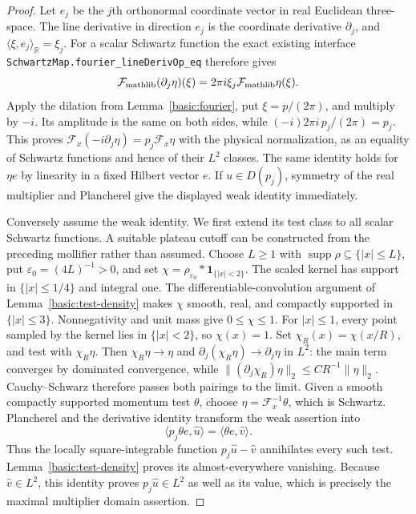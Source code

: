 \documentclass[11pt,a4paper]{article}
\theoremstyle{definition}
\theoremstyle{remark}
\begin{document}
\begin{proof}
Let $e_j$ be the $j$th orthonormal coordinate vector in real Euclidean
three-space. The line derivative in direction $e_j$ is the coordinate
derivative $\partial_j$, and $\langle\xi,e_j\rangle_{\mathbb R}=\xi_j$.
For a scalar Schwartz function the exact existing interface
\nolinkurl{SchwartzMap.fourier_lineDerivOp_eq} therefore gives
\[
 \mathcal F_{\rm mathlib}(\partial_j\eta)(\xi)
       =2\pi i\xi_j\mathcal F_{\rm mathlib}\eta(\xi).
\]
Apply the dilation from Lemma~\ref{basic:fourier}, put
$\xi=p/(2\pi)$, and multiply by $-i$. Its amplitude is the same
on both sides, while $(-i)2\pi i\,p_j/(2\pi)=p_j$.
This proves
$\mathcal F_x(-i\partial_j\eta)=p_j\mathcal F_x\eta$ with the
physical normalization, as an equality of Schwartz functions and
hence of their $L^2$ classes. The same identity holds for $\eta e$
by linearity in a fixed Hilbert vector $e$. If $u\in D(p_j)$,
symmetry of the real multiplier and
Plancherel give the displayed weak identity immediately.

Conversely assume the weak identity. We first extend its test class
to all scalar Schwartz functions. A suitable plateau cutoff can be
constructed from the preceding mollifier rather than assumed. Choose
$L\geq1$ with $\operatorname{supp}\rho\subseteq\{|x|\leq L\}$,
put $\varepsilon_0=(4L)^{-1}>0$, and set
$\chi=\rho_{\varepsilon_0}*\mathbf1_{\{|x|<2\}}$.
The scaled kernel has support in $\{|x|\leq1/4\}$ and integral one.
The differentiable-convolution argument of
Lemma~\ref{basic:test-density} makes $\chi$ smooth, real, and compactly
supported in $\{|x|\leq3\}$. Nonnegativity and unit mass give
$0\leq\chi\leq1$. For $|x|\leq1$, every point sampled by the kernel
lies in $\{|x|<2\}$, so $\chi(x)=1$.
Set $\chi_R(x)=\chi(x/R)$, and test with $\chi_R\eta$. Then $\chi_R\eta\to\eta$ and
$\partial_j(\chi_R\eta)\to\partial_j\eta$ in $L^2$: the main term
converges by dominated convergence, while
$\|(\partial_j\chi_R)\eta\|_2\leq C R^{-1}\|\eta\|_2$.
Cauchy--Schwarz therefore passes both pairings to the limit.
Given a smooth compactly supported momentum test $\theta$, choose
$\eta=\mathcal F_x^{-1}\theta$, which is Schwartz. Plancherel and
the derivative identity transform the weak assertion into
\[
 \langle p_j\theta e,\widehat u\rangle
       =\langle\theta e,\widehat v\rangle.
\]
Thus the locally square-integrable function
$p_j\widehat u-\widehat v$ annihilates every such test.
Lemma~\ref{basic:test-density} proves its almost-everywhere vanishing.
Because $\widehat v\in L^2$, this identity proves
$p_j\widehat u\in L^2$ as well as its value, which is precisely the
maximal multiplier domain assertion.


\end{proof}
\end{document}
